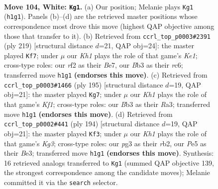 \documentclass[11pt]{article}
\begin{document}
\clearpage

\begin{figure}[p]\centering
\begin{subfigure}{0.46\textwidth}\centering
\resizebox{\linewidth}{!}{%
\newchessgame
\chessboard[
  setfen={5k2/5p2/6p1/4P3/1n3P2/1B4p1/5r2/7K w - - 6 104},
  showmover=false,
  pgfstyle=straightmove, color=movearrow, markmove={h1-g1}
]}
\caption{}
\end{subfigure}\hfill
\begin{subfigure}{0.46\textwidth}\centering
\resizebox{\linewidth}{!}{%
\newchessgame
\chessboard[
  setfen={4k3/4b3/2R3p1/7p/4N2P/5PP1/r7/6K1 b - - 44 110},
  showmover=false,
  pgfstyle=straightmove, color=movearrow, markmove={e8-f7}
]}
\caption{}
\end{subfigure}
\\[4pt]
\begin{subfigure}{0.46\textwidth}\centering
\resizebox{\linewidth}{!}{%
\newchessgame
\chessboard[
  setfen={5k2/3R1p2/4p3/4P1P1/5P1K/r7/8/8 b - - 12 98},
  showmover=false,
  pgfstyle=straightmove, color=movearrow, markmove={f8-g7}
]}
\caption{}
\end{subfigure}\hfill
\begin{subfigure}{0.46\textwidth}\centering
\resizebox{\linewidth}{!}{%
\newchessgame
\chessboard[
  setfen={8/3k1p2/4p1p1/4P1P1/4B3/4B1K1/1r6/8 w - - 20 98},
  showmover=false,
  pgfstyle=straightmove, color=movearrow, markmove={g3-f3}
]}
\caption{}
\end{subfigure}
\caption{\textbf{Move 104, White: \texttt{Kg1}.} (a) Our position; Melanie plays \texttt{Kg1} (\texttt{h1g1}). Panels (b)--(d) are the retrieved master positions whose correspondence most drove this move (highest QAP objective among those that transfer to it). (b) Retrieved from \texttt{ccrl\_top\_p0003\#2391} (ply 219) [structural distance $d$=21, QAP obj=24]: the master played \texttt{Kf7}; under $\mu$ our \emph{Kh1} plays the role of that game's \emph{Ke1}; cross-type roles: our \emph{r}f2 as their \emph{B}e7, our \emph{B}b3 as their \emph{r}c6; transferred move \texttt{h1g1} \textbf{(endorses this move)}. (c) Retrieved from \texttt{ccrl\_top\_p0003\#1466} (ply 195) [structural distance $d$=19, QAP obj=21]: the master played \texttt{Kg7}; under $\mu$ our \emph{Kh1} plays the role of that game's \emph{Kf1}; cross-type roles: our \emph{B}b3 as their \emph{R}a3; transferred move \texttt{h1g1} \textbf{(endorses this move)}. (d) Retrieved from \texttt{ccrl\_top\_p0002\#441} (ply 194) [structural distance $d$=19, QAP obj=21]: the master played \texttt{Kf3}; under $\mu$ our \emph{Kh1} plays the role of that game's \emph{Kg3}; cross-type roles: our \emph{p}g3 as their \emph{r}b2, our \emph{P}e5 as their \emph{B}e3; transferred move \texttt{h1g1} \textbf{(endorses this move)}. Synthesis: 16 retrieved analogs transferred to \texttt{Kg1} (summed QAP objective 139, the strongest correspondence among the candidate moves); Melanie committed it via the \texttt{search} selector.}
\label{fig:thought-m206}
\end{figure}
\end{document}
